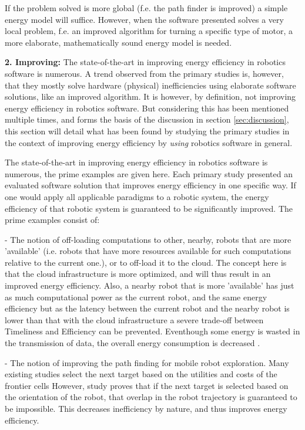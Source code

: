If the problem solved is more global (f.e. the path finder is improved) a simple energy model will suffice.
However, when the software presented solves a very local problem, f.e. an improved algorithm for turning a specific type of motor,
a more elaborate, mathematically sound energy model is needed.

\vspace{5mm}

\noindent\textbf{2. Improving:}
The state-of-the-art in improving energy efficiency in robotics software is numerous. 
A trend observed from the primary studies is, however, that they mostly solve hardware (physical) inefficiencies using elaborate
software solutions, like an improved algorithm.
It is however, by definition, not improving energy efficiency in robotics software.
But considering this has been mentioned multiple times, and forms the basis of the discussion in section \ref{sec:discussion}, 
this section will detail what has been found by studying the primary studies in the context of improving energy efficiency 
by \textit{using} robotics software in general.

The state-of-the-art in improving energy efficiency in robotics software is numerous, the prime examples are given here.
Each primary study presented an evaluated software solution that improves energy efficiency in one specific way.
If one would apply all applicable paradigms to a robotic system, 
the energy efficiency of that robotic system is guaranteed to be significantly improved.
The prime examples consist of:

- The notion of off-loading computations to other, nearby, robots that are more 'available' 
(i.e. robots that have more resources available for such computations relative to the current one.), or to off-load it to the cloud.
The concept here is that the cloud infrastructure is more optimized, and will thus result in an improved energy efficiency. 
Also, a nearby robot that is more 'available' has just as much computational power as the current robot, and the same energy efficiency
but as the latency between the current robot and the nearby robot is lower than that with the cloud infrastructure a severe trade-off between
Timeliness and Efficiency can be prevented.
Eventhough some energy is wasted in the transmission of data, the overall energy consumption is decreased \cite{rahman2019cloud_robot_offloading}.
    
- The notion of improving the path finding for mobile robot exploration. 
Many existing studies select the next target based on the utilities and costs of the frontier cells 
\cite{burgard2005multi_robot_exploration, simmons2000multi_robot_exploration,zlot2002multi_robot_exploration} 
However, study \cite{mei2006mobile_exploration} proves that if the next target is selected based on the orientation of the robot, 
that overlap in the robot trajectory is guaranteed to be impossible. This decreases inefficiency by nature, and thus improves energy 
efficiency.

